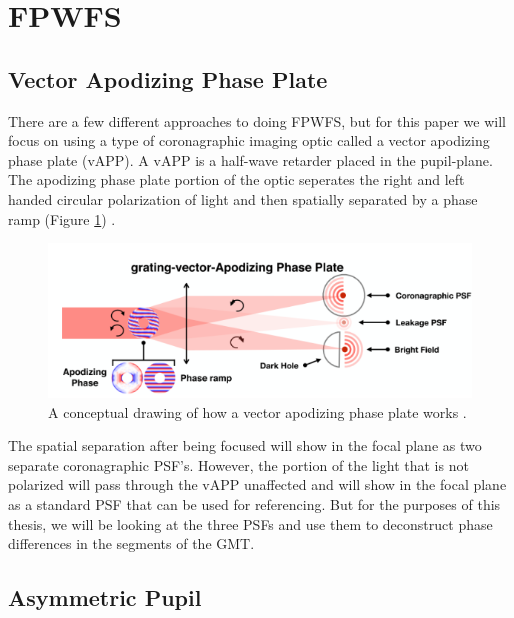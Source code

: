     

\section{FPWFS}
\label{sec:fpwfs}



\subsection{Vector Apodizing Phase Plate}
\label{sec:vAPP}

There are a few different approaches to doing FPWFS, but for this paper we will focus on using a type of coronagraphic imaging optic called a vector apodizing phase plate (vAPP).  A vAPP is a half-wave retarder placed in the pupil-plane.  The apodizing phase plate portion of the optic seperates the right and left handed circular polarization of light and then spatially separated by a phase ramp (Figure \ref{fig:vapp_concept}) \cite{Bos2019Focal-planePlate}.



\begin{figure}[H]
\centering
\includegraphics[width=14 cm]{Figures/vAPP.png}
\caption{A conceptual drawing of how a vector apodizing phase plate works \cite{Bos2019Focal-planePlate}.}
\label{fig:vapp_concept}
\end{figure}

The spatial separation after being focused will show in the focal plane as two separate coronagraphic PSF's.  However, the portion of the light that is not polarized will pass through the vAPP unaffected and will show in the focal plane as a standard PSF that can be used for referencing.  But for the purposes of this thesis, we will be looking at the three PSFs and use them to deconstruct phase differences in the segments of the GMT.


\subsection{Asymmetric Pupil}
\label{sec:asym_pupil}

